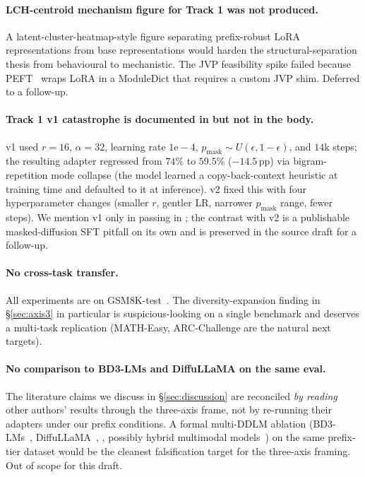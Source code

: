 \paragraph{LCH-centroid mechanism figure for Track 1 was not
produced.}  A latent-cluster-heatmap-style figure separating
prefix-robust LoRA representations from base \LLaDA{}
representations would harden the structural-separation thesis
from behavioural to mechanistic.  The JVP feasibility spike
failed because PEFT~\citep{mangrulkar2022peft} wraps LoRA in a
 ModuleDict that requires a custom
JVP shim.  Deferred to a follow-up.

\paragraph{Track 1 v1 catastrophe is documented in
 but not in the body.}  v1 used $r{=}16$,
$\alpha{=}32$, learning rate $1\mathrm{e}{-}4$, $p_\text{mask}
\sim U(\epsilon, 1{-}\epsilon)$, and $14$k steps; the resulting
adapter regressed \ctwo{} from $74\%$ to $59.5\%$ ($-14.5$\,pp)
via bigram-repetition mode collapse (the model learned a
copy-back-context heuristic at training time and defaulted to it
at inference).  v2 fixed this with four hyperparameter changes
(smaller $r$, gentler LR, narrower $p_\text{mask}$ range, fewer
steps).  We mention v1 only in passing in
; the contrast with v2 is a
publishable masked-diffusion SFT pitfall on its own and is
preserved in the source draft for a follow-up.

\paragraph{No cross-task transfer.}  All experiments are on
GSM8K-test~\citep{cobbe2021gsm8k}.  The diversity-expansion
finding in \S\ref{sec:axis3} in particular is suspicious-looking
on a single benchmark and deserves a multi-task replication
(MATH-Easy, ARC-Challenge are the natural next targets).

\paragraph{No comparison to BD3-LMs and DiffuLLaMA on the same
eval.}  The literature claims we discuss in
\S\ref{sec:discussion} are reconciled \emph{by reading} other
authors' results through the three-axis frame, not by re-running
their adapters under our prefix conditions.  A formal multi-DDLM
ablation (BD3-LMs~\citep{arriola2025bd3lms},
DiffuLLaMA~\citep{gong2024diffullama}, \LLaDA{}, possibly hybrid
multimodal models~\citep{zhou2024transfusion,xie2024showo,ma2025janusflow})
on the same prefix-tier dataset would be the cleanest
falsification target for the three-axis framing.  Out of scope
for this draft.

